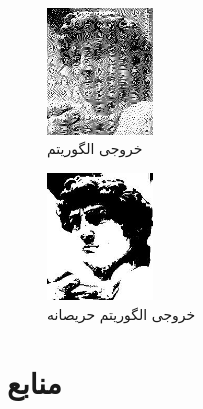 \documentclass{article}
\begin{document}
\begin{figure}[H]
    \centering
    \includegraphics[width=0.25\textwidth]{figures/3c1.jpg}
    \caption
	{
خروجی الگوریتم 
	}
    \label{fig:fig1}
\end{figure}
\begin{figure}[H]
    \centering
    \includegraphics[width=0.25\textwidth]{figures/3c2.jpg}
    \caption
	{
خروجی الگوریتم حریصانه
	}
    \label{fig:fig1}
\end{figure}






%






\section*{منابع}
\renewcommand{\section}[2]{}%
\begin{thebibliography}{99} %


\begin{LTRitems}

\resetlatinfont

\end{LTRitems}

\end{thebibliography}
\end{document}

